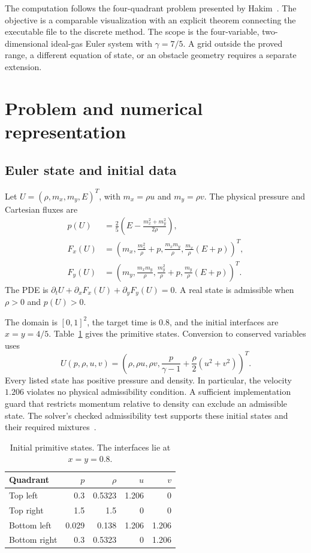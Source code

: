 \documentclass[11pt]{article}
\begin{document}
The computation follows the four-quadrant problem presented by Hakim~\cite{lanyon}.  The objective is a comparable visualization with an explicit theorem connecting the executable file to the discrete method.  The scope is the four-variable, two-dimensional ideal-gas Euler system with $\gamma=7/5$.  A grid outside the proved range, a different equation of state, or an obstacle geometry requires a separate extension.

\section{Problem and numerical representation}

\subsection{Euler state and initial data}

Let $U=(\rho,m_x,m_y,E)^T$, with $m_x=\rho u$ and $m_y=\rho v$.  The physical pressure and Cartesian fluxes are
\begin{align}
p(U)&=\frac25\left(E-\frac{m_x^2+m_y^2}{2\rho}\right),\label{eq:pressure}\\
F_x(U)&=\left(m_x,\frac{m_x^2}{\rho}+p,\frac{m_xm_y}{\rho},\frac{m_x}{\rho}(E+p)\right)^T,\label{eq:flux}\\
F_y(U)&=\left(m_y,\frac{m_xm_y}{\rho},\frac{m_y^2}{\rho}+p,\frac{m_y}{\rho}(E+p)\right)^T.
\end{align}
The PDE is $\partial_t U+\partial_xF_x(U)+\partial_yF_y(U)=0$.  A real state is admissible when $\rho>0$ and $p(U)>0$.

The domain is $[0,1]^2$, the target time is $0.8$, and the initial interfaces are $x=y=4/5$.  Table~\ref{tab:initial} gives the primitive states.  Conversion to conserved variables uses
\begin{equation}
U(p,\rho,u,v)=\left(\rho,\rho u,\rho v,\frac{p}{\gamma-1}+\frac{\rho}{2}(u^2+v^2)\right)^T.
\end{equation}
Every listed state has positive pressure and density.  In particular, the velocity $1.206$ violates no physical admissibility condition.  A sufficient implementation guard that restricts momentum relative to density can exclude an admissible state.  The solver's checked admissibility test supports these initial states and their required mixtures~\cite{initial}.

\begin{table}[htbp]
\centering
\begin{tabular}{lrrrr}
\toprule
Quadrant & $p$ & $\rho$ & $u$ & $v$\\
\midrule
Top left & 0.3 & 0.5323 & 1.206 & 0\\
Top right & 1.5 & 1.5 & 0 & 0\\
Bottom left & 0.029 & 0.138 & 1.206 & 1.206\\
Bottom right & 0.3 & 0.5323 & 0 & 1.206\\
\bottomrule
\end{tabular}
\caption{Initial primitive states.  The interfaces lie at $x=y=0.8$.}
\label{tab:initial}
\end{table}
\end{document}
